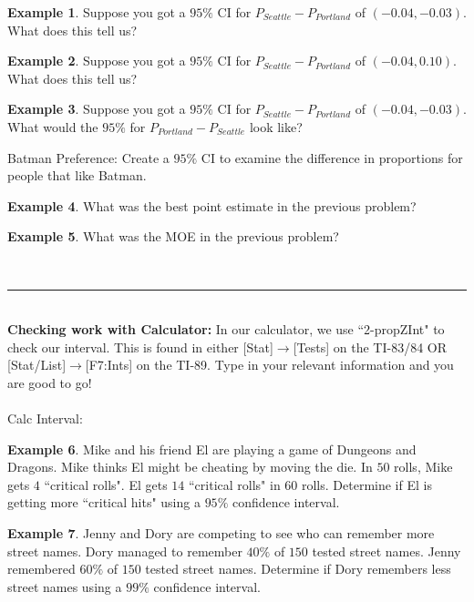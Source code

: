 \documentclass[12pt]{amsart}
\theoremstyle{definition}
\newtheorem{ex}{Example}
\begin{document}
 \vfill
 
 \begin{ex} Suppose you got a $95\%$ CI for $P_{Seattle}-P_{Portland}$ of $(-0.04,-0.03)$. What does this tell us?
 \end{ex}
 
 \vfill
 
 \begin{ex} Suppose you got a $95\%$ CI for $P_{Seattle}-P_{Portland}$ of $(-0.04,0.10)$. What does this tell us?
 \end{ex}
 
 \vfill
 
 \begin{ex} Suppose you got a $95\%$ CI for $P_{Seattle}-P_{Portland}$ of $(-0.04,-0.03)$. What would the $95\%$ for $P_{Portland}-P_{Seattle}$ look like?
 \end{ex}
 
 \vfill

 \newpage

 Batman Preference: Create a $95\%$ CI to examine the difference in proportions for people that like Batman.
 \vspace{3in}
 
\begin{ex} What was the best point estimate in the previous problem?\end{ex}

\begin{ex} What was the MOE in the previous problem?\end{ex}
~\\
\hrule
~\\
\noindent \textbf{Checking work with Calculator:} In our calculator, we use ``2-propZInt" to check our interval. This is found in either [Stat]$\rightarrow$[Tests] on the TI-83/84 OR [Stat/List]$\rightarrow$[F7:Ints] on the TI-89. Type in your relevant information and you are good to go!\\
~\\
Calc Interval:
\newpage
\begin{ex}
	Mike and his friend El are playing a game of Dungeons and Dragons. Mike thinks El might be cheating by moving the die. In $50$ rolls, Mike gets $4$ ``critical rolls". El gets $14$ ``critical rolls" in $60$ rolls. Determine if El is getting more ``critical hits" using a $95\%$ confidence interval.
\end{ex}

\begin{ex}
	Jenny and Dory are competing to see who can remember more street names. Dory managed to remember $40\%$ of $150$ tested street names. Jenny remembered $60\%$ of $150$ tested street names. Determine if Dory remembers less street names using a $99\%$ confidence interval.
\end{ex}
\end{document}
